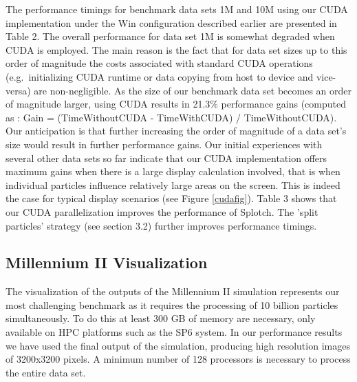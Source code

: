 \documentclass[1p,times]{elsarticle}
\begin{document}
The performance timings for benchmark data sets 1M and 10M using our CUDA
implementation under the Win configuration described earlier are presented in Table 2. 
The overall performance for data set 1M is somewhat degraded when CUDA is employed.
The main reason is the fact that for data set sizes up to this order of magnitude the
costs associated with standard CUDA operations (e.g.\ initializing CUDA runtime 
or data copying from host to device and vice-versa) are non-negligible. 
As the size of our benchmark data set becomes an order of magnitude larger,
using CUDA results in 21.3\% performance gains (computed as
: Gain = (TimeWithoutCUDA - TimeWithCUDA) / TimeWithoutCUDA). 
Our anticipation is that further increasing the order of magnitude of a data set's 
size would result in further performance gains. Our initial experiences with several 
other data sets so far indicate that our CUDA implementation offers maximum gains
when there is a large display calculation involved, that is when individual particles influence relatively large areas on the screen. This is indeed the case for typical display scenarios (see Figure \ref{cudafig}). Table 3 shows that our CUDA parallelization improves the 
performance of Splotch. The 'split particles' strategy (see section 3.2) further 
improves performance timings.
 

\subsection{Millennium II Visualization}
\label{mII}

The visualization of the outputs of the Millennium II simulation \cite{2009MNRAS.398.1150B} 
represents our most challenging benchmark as it requires the processing of 10 billion particles 
simultaneously. To do this at least 300 GB of memory are necessary, only available 
on HPC platforms such as the SP6 system.
In our performance results we have used the final output of the simulation, producing 
high resolution images of 3200x3200 pixels. A minimum number of 128 processors 
is necessary to process the entire data set.
\end{document}
